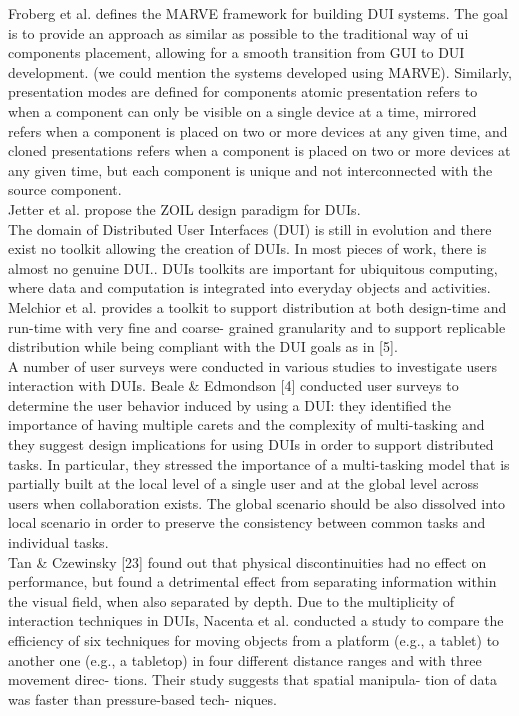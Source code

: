 Froberg et al. \cite{froberg2011model} defines the MARVE framework for building
DUI systems. The goal is to provide an approach as similar as possible to
the traditional way of ui components placement, allowing for a smooth
transition from GUI to DUI development. (we could mention the systems
developed using MARVE). Similarly, presentation modes are defined for
components atomic presentation refers to when a component can only be visible on a single
device at a time, mirrored refers when a component is placed on two or more
devices at any given time, and cloned presentations refers when a component is
placed on two or more devices at any given time, but each component is unique
and not interconnected with the source component.\\

Jetter et al. \cite{jetter2012design} propose the ZOIL design paradigm for
DUIs.\\
 
The domain of Distributed User Interfaces (DUI) is still in evolution and there exist no toolkit allowing the creation of DUIs.
In most pieces of work, there is almost no genuine
DUI.\cite{melchior2011distribution}. DUIs toolkits are important for ubiquitous computing, where data and computation is integrated into everyday objects and activities.\cite{elmqvist2011distributed}\\
Melchior et al. \cite{melchior69toolkit} provides a toolkit to support
distribution at both design-time and run-time with very fine and coarse- grained granularity and to support replicable distribution while being compliant with the DUI goals as in [5].\\

A number of user surveys were conducted in various studies to investigate users
interaction with DUIs. \cite{vanderdonckt2010distributed} Beale & Edmondson [4]
conducted user surveys to determine the user behavior induced by using a DUI: they identified the importance of having multiple carets and the complexity of multi-tasking and
they suggest design implications for using DUIs in order to support distributed
tasks. In particular, they stressed the importance of a multi-tasking model that
is partially built at the local level of a single user and at the global level
across users when collaboration exists. The global scenario should be also
dissolved into local scenario in order to preserve the consistency between
common tasks and individual tasks.\\ \cite{vanderdonckt2010distributed} Tan & Czewinsky [23] found out that physical discontinuities had no effect on performance, but found a detrimental effect from separating information within the visual field, when also separated by depth. Due to the multiplicity of interaction techniques in DUIs, Nacenta et al. conducted a study to compare the efficiency of six techniques for moving objects from a platform (e.g., a tablet) to another one (e.g., a tabletop) in four different distance ranges and with three movement direc- tions. Their study suggests that spatial manipula- tion of data was faster than pressure-based tech- niques.\\


